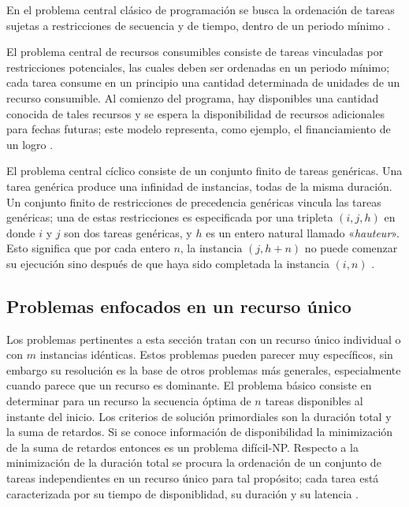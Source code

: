 \documentclass[spanish,draft,12pt,headsepline,footsepline,paper=letter]{scrreprt}
\begin{document}
En el problema central clásico de programación se busca la ordenación de tareas sujetas a restricciones de secuencia y de tiempo, dentro de un periodo mínimo \citep[p.~90]{gotha93les-problemes-dordonnancement}. 

El problema central de recursos consumibles consiste de tareas vinculadas por restricciones potenciales, las cuales deben ser ordenadas en un periodo mínimo; cada tarea consume en un principio una cantidad determinada de unidades de un recurso consumible. Al comienzo del programa, hay disponibles una cantidad conocida de tales recursos y se espera la disponibilidad de recursos adicionales para fechas futuras; este modelo representa, como ejemplo, el financiamiento de un logro \citep[p.~90,~91]{gotha93les-problemes-dordonnancement}.

El problema central cíclico consiste de un conjunto finito de tareas genéricas. Una tarea genérica produce una infinidad de instancias, todas de la misma duración. Un conjunto finito de restricciones de precedencia genéricas vincula las tareas genéricas; una de estas restricciones es especificada por una tripleta $(i, j, h)$ en donde $i$ y $j$ son dos tareas genéricas, y $h$ es un entero natural llamado «\textit{hauteur}». Esto significa que por cada entero $n$, la instancia $(j, h+n)$ no puede comenzar su ejecución sino después de que haya sido completada la instancia $(i,n)$ \citep[p.~92]{gotha93les-problemes-dordonnancement}.

\subsection{Problemas enfocados en un recurso único}
\label{problemas_enfocados_recurso_unico}

Los problemas pertinentes a esta sección tratan con un recurso único individual o con $m$ instancias idénticas. Estos problemas pueden parecer muy específicos, sin embargo su resolución es la base de otros problemas más generales, especialmente cuando parece que un recurso es dominante. 
%
El problema básico consiste en determinar para un recurso la secuencia óptima de $n$ tareas disponibles al instante del inicio. Los criterios de solución primordiales son la duración total y la suma de retardos. Si se conoce información de disponibilidad la minimización de la suma de retardos entonces es un problema difícil-NP. Respecto a la minimización de la duración total se procura la ordenación de un conjunto de tareas independientes en un recurso único para tal propósito; cada tarea está caracterizada por su tiempo de disponiblidad, su duración y su latencia \citep[p.~94-96]{gotha93les-problemes-dordonnancement}. 
\end{document}
